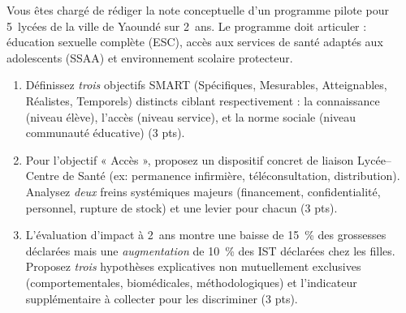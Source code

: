 \documentclass[11pt]{article}
\begin{document}
\begin{exercice}
Vous êtes chargé de rédiger la note conceptuelle d'un programme pilote pour \SI{5}{lycées} de la ville de Yaoundé sur \SI{2}{ans}. Le programme doit articuler : éducation sexuelle complète (ESC), accès aux services de santé adaptés aux adolescents (SSAA) et environnement scolaire protecteur.
\begin{enumerate}
    \item Définissez \textit{trois} objectifs SMART (Spécifiques, Mesurables, Atteignables, Réalistes, Temporels) distincts ciblant respectivement : la connaissance (niveau élève), l'accès (niveau service), et la norme sociale (niveau communauté éducative) (3 pts).
    \item Pour l'objectif « Accès », proposez un dispositif concret de liaison Lycée–Centre de Santé (ex: permanence infirmière, téléconsultation, distribution). Analysez \textit{deux} freins systémiques majeurs (financement, confidentialité, personnel, rupture de stock) et une levier pour chacun (3 pts).
    \item L'évaluation d'impact à \SI{2}{ans} montre une baisse de \SI{15}{\%} des grossesses déclarées mais une \textit{augmentation} de \SI{10}{\%} des IST déclarées chez les filles. Proposez \textit{trois} hypothèses explicatives non mutuellement exclusives (comportementales, biomédicales, méthodologiques) et l'indicateur supplémentaire à collecter pour les discriminer (3 pts).
\end{enumerate}
\end{exercice}
\end{document}
